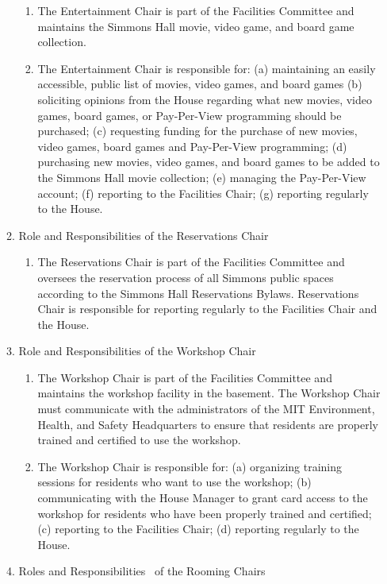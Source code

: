 \documentclass[letterpaper]{article}
\begin{document}
\begin{enumerate}
\begin{enumerate}
\begin{enumerate}
\item The Entertainment Chair is part of the Facilities Committee and
maintains the Simmons Hall movie, video game, and board game
collection.
\item The Entertainment Chair is responsible for: (a) maintaining an
easily accessible, public list of movies, video games, and board games
(b) soliciting opinions from the House regarding what new movies, video
games, board games, or Pay-Per-View programming should be purchased;
(c) requesting funding for the purchase of new movies, video games,
board games and Pay-Per-View programming; (d) purchasing new movies,
video games, and board games to be added to the Simmons Hall movie
collection; (e) managing the Pay-Per-View account; (f) reporting to the
Facilities Chair; (g) reporting regularly to the House.
\end{enumerate}
\item Role and Responsibilities of the Reservations Chair 

\begin{enumerate}
\item The Reservations Chair is part of the Facilities Committee and
oversees the reservation process of all Simmons public spaces according
to the {\textquotedbl}Simmons Hall Reservations Bylaws.{\textquotedbl}
Reservations Chair is responsible for reporting regularly to the
Facilities Chair and the House. 
\end{enumerate}
\item Role and Responsibilities of the Workshop Chair 

\begin{enumerate}
\item The Workshop Chair is part of the Facilities Committee and
maintains the workshop facility in the basement. The Workshop Chair
must communicate with the administrators of the MIT Environment,
Health, and Safety Headquarters to ensure that residents are properly
trained and certified to use the workshop.
\item The Workshop Chair is responsible for: (a) organizing training
sessions for residents who want to use the workshop; (b) communicating
with the House Manager to grant card access to the workshop for
residents who have been properly trained and certified; (c) reporting
to the Facilities Chair; (d) reporting regularly to the House.
\end{enumerate}
\item Roles and Responsibilities \ of the Rooming Chairs


\end{enumerate}
\end{enumerate}
\end{document}
